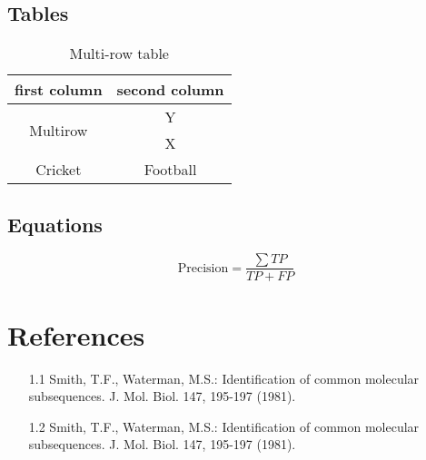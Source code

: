 \documentclass[12pt]{article}
\begin{document}
\subsection{Tables}

\begin{table}[h!]
    \centering
    \caption{Multi-row table}
    \begin{tabular}{|c|c|}
        \hline
        \textbf{first column}     & \textbf{second column} \\ \hline
        \multirow{2}{*}{Multirow} & Y                      \\ \cline{2-2}
                                  & X                      \\ \hline
        Cricket                   & Football               \\ \hline
    \end{tabular}

\end{table}



\subsection{Equations}

\begin{equation}

    \text{Precision} = \frac{\sum TP}{TP + FP}

\end{equation}



\section*{References}

\begin{itemize}

    \item[1.1] Smith, T.F., Waterman, M.S.: Identification of common molecular subsequences. J. Mol. Biol. 147, 195-197 (1981).
    \item[1.2] Smith, T.F., Waterman, M.S.: Identification of common molecular subsequences. J. Mol. Biol. 147, 195-197 (1981).

\end{itemize}
\end{document}
